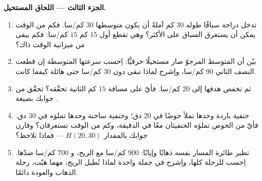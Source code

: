 \begin{problem}
\medskip
\noindent\textbf{الجزء الثالث --- اللحاق المستحيل.}
\begin{enumerate}[resume]
  \item تدخل دراجة سباقًا طوله $30$ كم آملةً أن يكون متوسطها
        $30$ كم/سا. فكم من الوقت يمكن أن يستغرق السباق على
        الأكثر؟ وهي تقطع أول $15$ كم  $15$ كم/سا: فكم
        يبقى من ميزانية الوقت ذاك؟
  \item بيّن أن المتوسط المرجوّ صار مستحيلًا
        حرفيًّا: اِحسب سرعتها المتوسطة إن قطعت
        النصف الثاني  $90$ كم/سا، واِشرح لماذا تبقى دون
        $30$ كم/سا حتى  هائلة كيفما كانت.
  \item ثم تخفض هدفها إلى $20$ كم/سا. فأيّ  على
        مسافة $15$ كم الثانية تحقّقه؟ تحقّق من جوابك بصيغة
        .
  \item حنفية باردة وحدها تملأ حوضًا في $20$ دق؛ وحنفية ساخنة وحدها
        تملؤه في $30$ دق. فأيّ  من الحوض تملؤه الحنفيتان
        معًا في الدقيقة، وكم من الوقت تستغرقان؟
        وقارن جوابك بالمقدار $H(20, 30)$ --- فماذا
        تلاحظ؟
  \item تطير طائرة المسار نفسه ذهابًا وإيابًا: $900$ كم/سا
        مع الريح، و $700$ كم/سا ضدّها. اِحسب
         للرحلة كلها، واِشرح في جملة واحدة لماذا
        تُطيل الريح، مهما هبّت، رحلة الذهاب
        والعودة دائمًا.
\end{enumerate}
\end{problem}
